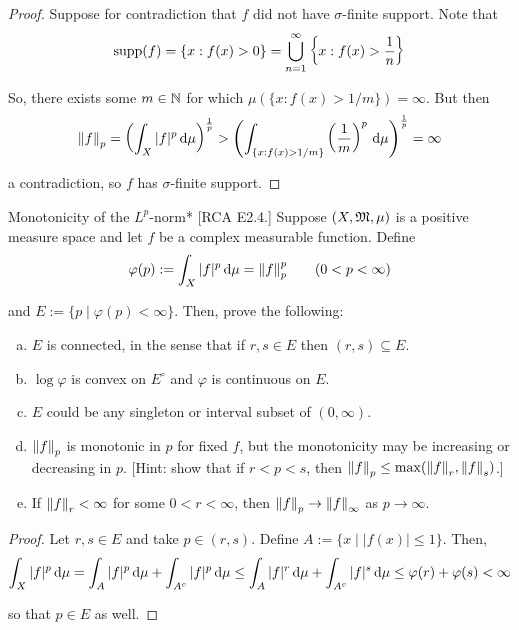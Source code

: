\begin{proof}
    Suppose for contradiction that \(f\) did not have \(\sigma\)-finite support. Note that 
    \[
        \operatorname{supp}(f) = \{x : f(x) > 0 \} = \bigcup_{n=1}^\infty \left\{ x : f(x) > \frac{1}{n} \right\}
    \]

    So, there exists some \(m \in \mathbb{N}\) for which \(\mu(\{x : f(x) > 1/m\}) = \infty\). But then
    \[
        \norm{f}_p = \left( \int_X |f|^p \, \mathrm{d}\mu \right)^{\frac{1}{p}}
        > \left( \int_{\{x : f(x) > 1/m\}} \left(\frac{1}{m}\right)^p \, \mathrm{d}\mu \right)^{\frac{1}{p}}
        = \infty
    \]

    a contradiction, so \(f\) has \(\sigma\)-finite support. 
\end{proof}


\begin{problem}{Monotonicity of the \(L^p\)-norm}*
    [RCA E2.4.] Suppose \((X, \mathfrak{M}, \mu)\) is a positive measure space and let \(f\) be a complex measurable function. Define 
    \[
        \varphi(p) := \int_X |f|^p \, \mathrm{d}\mu = \norm{f}_p^p
        \qquad (0 < p < \infty) 
    \]

    and \(E := \{ p \mid \varphi(p) < \infty\}\). Then, prove the following: 
    \begin{enumerate}[(a)]
        \itemsep0em
        \item \(E\) is connected, in the sense that if \(r, s \in E\) then \((r, s) \subseteq E\). 
        \item \(\log \varphi\) is convex on \(E^\circ\) and \(\varphi\) is continuous on \(E\). 
        \item \(E\) could be any singleton or interval subset of \((0, \infty)\). 
        \item \(\norm{f}_p\) is monotonic in \(p\) for fixed \(f\), but the monotonicity may be increasing or decreasing in \(p\). [Hint: show that if \(r < p < s\), then \(\norm{f}_p \leq \max(\norm{f}_r, \norm{f}_s)\).]
        \item If \(\norm{f}_r < \infty\) for some \(0 < r < \infty\), then \(\norm{f}_p \to \norm{f}_\infty\) as \(p \to \infty\). 
    \end{enumerate}
\end{problem}

\begin{proof}
     Let \(r, s \in E\) and take \(p \in (r, s)\). Define \(A := \{ x \mid |f(x)| \leq 1\}\). Then, 
    \[
        \int_X |f|^p \, \mathrm{d} \mu 
        = \int_{A} |f|^p \, \mathrm{d}\mu + \int_{A^c} |f|^p \, \mathrm{d}\mu
        \leq \int_A |f|^r \, \mathrm{d}\mu + \int_{A^c} |f|^s \, \mathrm{d}\mu
        \leq \varphi(r) + \varphi(s) < \infty
    \]

    so that \(p \in E\) as well. 
\end{proof}

